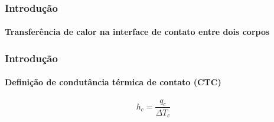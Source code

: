 \documentclass{beamer}
\begin{document}
\begin{frame}
	\frametitle{Introdução}
	\framesubtitle{Transferência de calor na interface de contato entre dois corpos}
	\begin{figure}[h!b]
		\begin{center}
		\end{center}
	\end{figure}	
\end{frame}

\begin{frame}
	\frametitle{Introdução}
	\framesubtitle{Definição de condutância térmica de contato (CTC)}
	\begin{equation*}
	h_c = \frac{q_c}{\Delta T_c}
	\end{equation*}
\end{frame}
\end{document}
